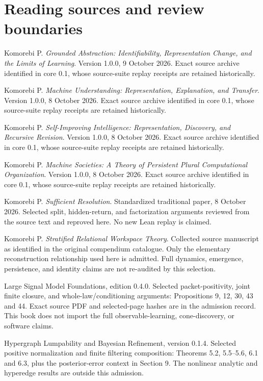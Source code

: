 \chapter{Reading sources and review boundaries}
\begin{description}[style=nextline]
\item[GA] Komorebi P. \emph{Grounded Abstraction: Identifiability, Representation Change, and the Limits of Learning}. Version 1.0.0, 9 October 2026. Exact source archive identified in core 0.1, whose source-suite replay receipts are retained historically.
\item[MU] Komorebi P. \emph{Machine Understanding: Representation, Explanation, and Transfer}. Version 1.0.0, 8 October 2026. Exact source archive identified in core 0.1, whose source-suite replay receipts are retained historically.
\item[SII] Komorebi P. \emph{Self-Improving Intelligence: Representation, Discovery, and Recursive Revision}. Version 1.0.0, 8 October 2026. Exact source archive identified in core 0.1, whose source-suite replay receipts are retained historically.
\item[MS] Komorebi P. \emph{Machine Societies: A Theory of Persistent Plural Computational Organization}. Version 1.0.0, 8 October 2026. Exact source archive identified in core 0.1, whose source-suite replay receipts are retained historically.
\item[SR] Komorebi P. \emph{Sufficient Resolution}. Standardized traditional paper, 8 October 2026. Selected split, hidden-return, and factorization arguments reviewed from the source text and reproved here. No new Lean replay is claimed.
\item[SRWT] Komorebi P. \emph{Stratified Relational Workspace Theory}. Collected source manuscript as identified in the original compendium catalogue. Only the elementary reconstruction relationship used here is admitted. Full dynamics, emergence, persistence, and identity claims are not re-audited by this selection.
\item[LSM] Large Signal Model Foundations, edition 0.4.0.
Selected packet-positivity, joint finite closure, and whole-law/conditioning arguments: Propositions 9, 12, 30, 43 and 44. Exact source PDF and selected-page hashes are in the admission record. This book does not import the full observable-learning, cone-discovery, or software claims.

\item[PRIQ] Hypergraph Lumpability and Bayesian Refinement, version 0.1.4.
Selected positive normalization and finite filtering composition: Theorems 5.2, 5.5--5.6, 6.1 and 6.3, plus the posterior-error context in Section 9. The nonlinear analytic and hyperedge results are outside this admission.


\end{description}
